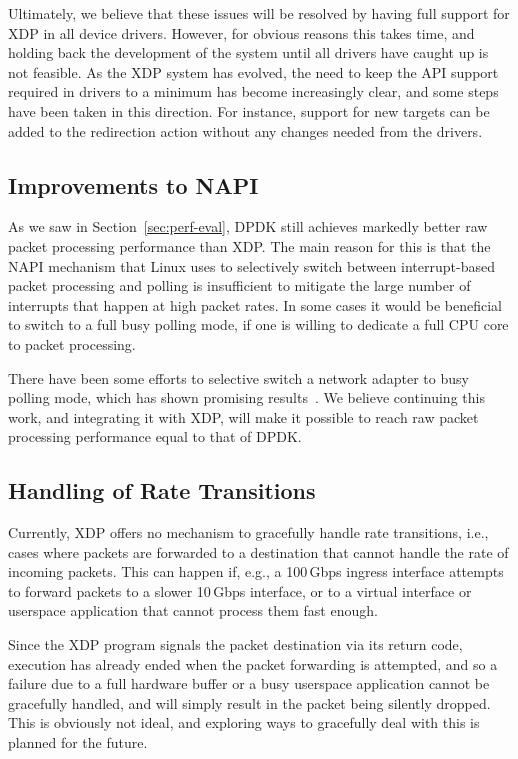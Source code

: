 \documentclass[10pt,sigconf]{acmart}
\begin{document}
Ultimately, we believe that these issues will be resolved by having full support
for XDP in all device drivers. However, for obvious reasons this takes time, and
holding back the development of the system until all drivers have caught up is
not feasible. As the XDP system has evolved, the need to keep the API support
required in drivers to a minimum has become increasingly clear, and some steps
have been taken in this direction. For instance, support for new targets can be
added to the redirection action without any changes needed from the drivers.

\subsection{Improvements to NAPI}
\label{sec:improvements-napi}
As we saw in Section~\ref{sec:perf-eval}, DPDK still achieves markedly better
raw packet processing performance than XDP. The main reason for this is that the
NAPI mechanism that Linux uses to selectively switch between interrupt-based
packet processing and polling is insufficient to mitigate the large number of
interrupts that happen at high packet rates. In some cases it would be
beneficial to switch to a full busy polling mode, if one is willing to dedicate
a full CPU core to packet processing.

There have been some efforts to selective switch a network adapter to busy
polling mode, which has shown promising results~\cite{dumazet17:_busyp}. We
believe continuing this work, and integrating it with XDP, will make it possible
to reach raw packet processing performance equal to that of DPDK.

\subsection{Handling of Rate Transitions}
\label{sec:handl-rate-trans}
Currently, XDP offers no mechanism to gracefully handle rate transitions, i.e.,
cases where packets are forwarded to a destination that cannot handle the rate
of incoming packets. This can happen if, e.g., a 100\,Gbps ingress interface
attempts to forward packets to a slower 10\,Gbps interface, or to a virtual
interface or userspace application that cannot process them fast enough.

Since the XDP program signals the packet destination via its return code,
execution has already ended when the packet forwarding is attempted, and so a
failure due to a full hardware buffer or a busy userspace application cannot be
gracefully handled, and will simply result in the packet being silently dropped.
This is obviously not ideal, and exploring ways to gracefully deal with this is
planned for the future.
\end{document}

